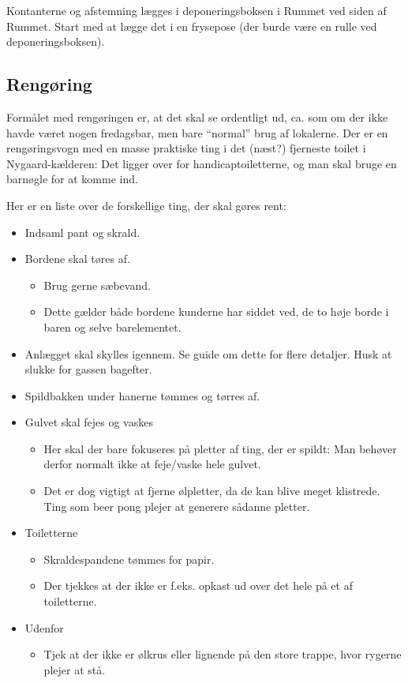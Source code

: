 Kontanterne og afstemning lægges i deponeringsboksen i Rummet ved
siden af Rummet. Start med at lægge det i en frysepose (der burde være
en rulle ved deponeringsboksen).

\subsection{Rengøring}
\label{sec:post:rengoring}

Formålet med rengøringen er, at det skal se ordentligt ud, ca. som om
der ikke havde været nogen fredagsbar, men bare ``normal'' brug af
lokalerne. Der er en rengøringsvogn med en masse praktiske ting i det
(næst?) fjerneste toilet i Nygaard-kælderen: Det ligger over for
handicaptoiletterne, og man skal bruge en barnøgle for at komme ind.

Her er en liste over de forskellige ting, der skal gøres rent:
\begin{itemize}
\item Indsaml pant og skrald.
\item Bordene skal tøres af.
  \begin{itemize}
  \item Brug gerne sæbevand.
  \item Dette gælder både bordene kunderne har siddet ved, de to høje
    borde i baren og selve barelementet.
  \end{itemize}
\item Anlægget skal skylles igennem. Se guide om dette for flere
  detaljer. Husk at slukke for gassen bagefter.
\item Spildbakken under hanerne tømmes og tørres af.
\item Gulvet skal fejes og vaskes
  \begin{itemize}
  \item Her skal der bare fokuseres på pletter af ting, der er spildt:
    Man behøver derfor normalt ikke at feje/vaske hele gulvet.
  \item Det er dog vigtigt at fjerne ølpletter, da de kan blive meget
    klistrede. Ting som beer pong plejer at generere sådanne pletter.
  \end{itemize}
\item Toiletterne
  \begin{itemize}
  \item Skraldespandene tømmes for papir.
  \item Der tjekkes at der ikke er f.eks. opkast ud over det hele på
    et af toiletterne.
  \end{itemize}
\item Udenfor
  \begin{itemize}
  \item Tjek at der ikke er ølkrus eller lignende på den store trappe,
    hvor rygerne plejer at stå.
  \end{itemize}
\end{itemize}

